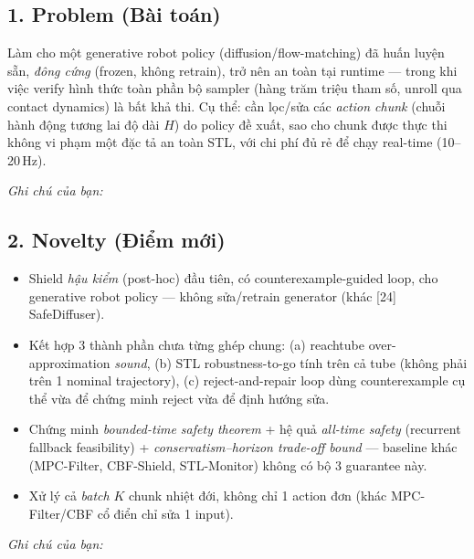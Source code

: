 \documentclass[a4paper,12pt]{article}
\begin{document}
\subsection*{1. Problem (Bài toán)}
Làm cho một generative robot policy (diffusion/flow-matching) đã huấn luyện sẵn, \emph{đông cứng} (frozen, không retrain), trở nên an toàn tại runtime — trong khi việc verify hình thức toàn phần bộ sampler (hàng trăm triệu tham số, unroll qua contact dynamics) là bất khả thi. Cụ thể: cần lọc/sửa các \emph{action chunk} (chuỗi hành động tương lai độ dài $H$) do policy đề xuất, sao cho chunk được thực thi không vi phạm một đặc tả an toàn STL, với chi phí đủ rẻ để chạy real-time (10--20\,Hz).

\begin{tasklist}
  \item[\square] \textit{Ghi chú của bạn:} \underline{\hspace{10cm}}
\end{tasklist}

\subsection*{2. Novelty (Điểm mới)}
\begin{itemize}
  \item Shield \emph{hậu kiểm} (post-hoc) đầu tiên, có counterexample-guided loop, cho generative robot policy — không sửa/retrain generator (khác [24] SafeDiffuser).
  \item Kết hợp 3 thành phần chưa từng ghép chung: (a) reachtube over-approximation \emph{sound}, (b) STL robustness-to-go tính trên cả tube (không phải trên 1 nominal trajectory), (c) reject-and-repair loop dùng counterexample cụ thể vừa để chứng minh reject vừa để định hướng sửa.
  \item Chứng minh \emph{bounded-time safety theorem} + hệ quả \emph{all-time safety} (recurrent fallback feasibility) + \emph{conservatism--horizon trade-off bound} — baseline khác (MPC-Filter, CBF-Shield, STL-Monitor) không có bộ 3 guarantee này.
  \item Xử lý cả \emph{batch} $K$ chunk nhiệt đới, không chỉ 1 action đơn (khác MPC-Filter/CBF cổ điển chỉ sửa 1 input).
\end{itemize}
\begin{tasklist}
  \item[\square] \textit{Ghi chú của bạn:} \underline{\hspace{10cm}}
\end{tasklist}
\end{document}
